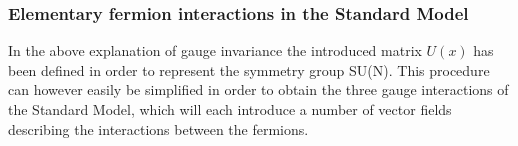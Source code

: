 \subsubsection{Elementary fermion interactions in the Standard Model}
In the above explanation of gauge invariance the introduced matrix $U(x)$ has been defined in order to represent the symmetry group SU(N). 
This procedure can however easily be simplified in order to obtain the three gauge interactions of the Standard Model, which will each introduce a number of vector fields describing the interactions between the fermions.

